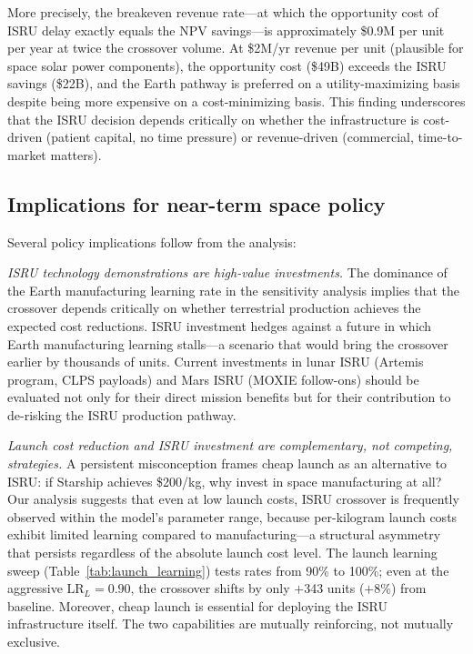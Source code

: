 \documentclass[preprint,12pt]{elsarticle}
\begin{document}
More precisely, the breakeven revenue rate---at which the opportunity cost of ISRU delay exactly equals the NPV savings---is approximately \$0.9M per unit per year at twice the crossover volume. At \$2M/yr revenue per unit (plausible for space solar power components), the opportunity cost (\$49B) exceeds the ISRU savings (\$22B), and the Earth pathway is preferred on a utility-maximizing basis despite being more expensive on a cost-minimizing basis. This finding underscores that the ISRU decision depends critically on whether the infrastructure is cost-driven (patient capital, no time pressure) or revenue-driven (commercial, time-to-market matters).

\subsection{Implications for near-term space policy}

Several policy implications follow from the analysis:

\emph{ISRU technology demonstrations are high-value investments.} The dominance of the Earth manufacturing learning rate in the sensitivity analysis implies that the crossover depends critically on whether terrestrial production achieves the expected cost reductions. ISRU investment hedges against a future in which Earth manufacturing learning stalls---a scenario that would bring the crossover earlier by thousands of units. Current investments in lunar ISRU (Artemis program, CLPS payloads) and Mars ISRU (MOXIE follow-ons) should be evaluated not only for their direct mission benefits but for their contribution to de-risking the ISRU production pathway.

\emph{Launch cost reduction and ISRU investment are complementary, not competing, strategies.} A persistent misconception frames cheap launch as an alternative to ISRU: if Starship achieves \$200/kg, why invest in space manufacturing at all? Our analysis suggests that even at low launch costs, ISRU crossover is frequently observed within the model's parameter range, because per-kilogram launch costs exhibit limited learning compared to manufacturing---a structural asymmetry that persists regardless of the absolute launch cost level. The launch learning sweep (Table~\ref{tab:launch_learning}) tests rates from 90\% to 100\%; even at the aggressive $\mathrm{LR}_L = 0.90$, the crossover shifts by only $+$343 units ($+$8\%) from baseline. Moreover, cheap launch is essential for deploying the ISRU infrastructure itself. The two capabilities are mutually reinforcing, not mutually exclusive.
\end{document}
